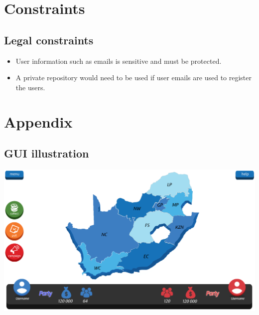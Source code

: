 \documentclass{article}
\begin{document}
	\section{Constraints}
		\subsection{Legal constraints}
			\begin{itemize}
				\item User information such as emails is sensitive and must be protected. 
				\item A private repository would need to be used if user emails are used to register the users.
			\end{itemize}
			
	
        
	\section{Appendix}
    	
		\subsection{GUI illustration}
			\includegraphics[width=1\linewidth]{Images/design.png}
\end{document}
